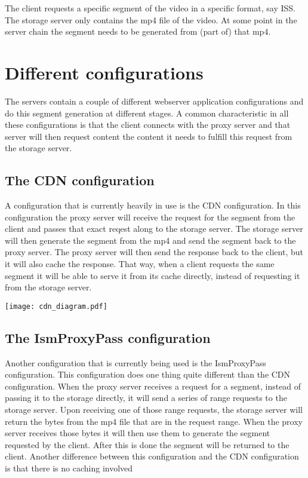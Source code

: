 \documentclass[twoside,openright]{uva-bachelor-thesis}
\begin{document}
The client requests a specific segment of the video in a specific format, say
ISS. The storage server only contains the mp4 file of the video. At some point
in the server chain the segment needs to be generated from (part of) that mp4.

\section{Different configurations}
The servers contain a couple of different webserver application configurations and
do this segment generation at different stages. A common characteristic in all
these configurations is that the client connects with the proxy server and that
server will then request content the content it needs to fulfill this request
from the storage server.


\subsection{The CDN configuration}
A configuration that is currently heavily in use is the CDN configuration. In
this configuration the proxy server will receive the request for the segment
from the client and passes that exact reqest along to the storage server. The
storage server will then generate the segment from the mp4 and send the segment
back to the proxy server.  The proxy server will then send the response back to
the client, but it will also cache the response. That way, when a client
requests the same segment it will be able to serve it from its cache directly,
instead of requesting it from the storage server.

\texttt{[image: cdn\_diagram.pdf]}



\subsection{The IsmProxyPass configuration}
Another configuration that is currently being used is the IsmProxyPass
configuration. This configuration does one thing quite different than the
CDN configuration. When the proxy server receives a request for a segment,
instead of passing it to the storage directly, it will send a series of range
requests to the storage server. Upon receiving one of those range requests, the
storage server will return the bytes from the mp4 file that are in the request
range. When the proxy server receives those bytes it will then use them to
generate the segment requested by the client. After this is done the segment
will be returned to the client. Another difference between this configuration
and the CDN configuration is that there is no caching involved
\end{document}

